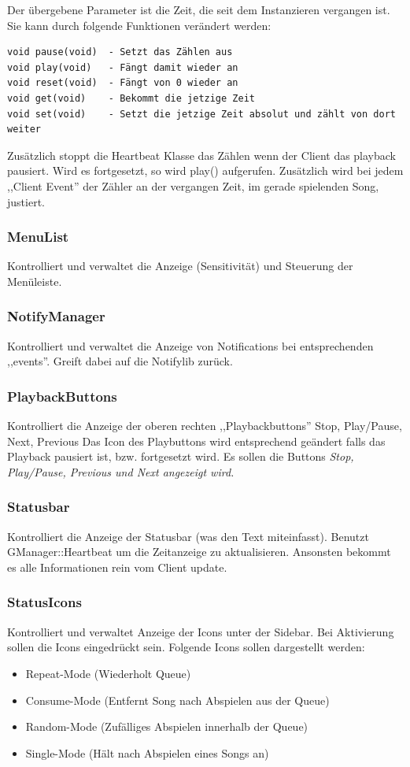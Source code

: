Der übergebene Parameter ist die Zeit, die seit dem Instanzieren vergangen ist. 
Sie kann durch folgende Funktionen verändert werden:
\begin{verbatim}
void pause(void)  - Setzt das Zählen aus
void play(void)   - Fängt damit wieder an
void reset(void)  - Fängt von 0 wieder an
void get(void)    - Bekommt die jetzige Zeit
void set(void)    - Setzt die jetzige Zeit absolut und zählt von dort weiter
\end{verbatim}

Zusätzlich stoppt die Heartbeat Klasse das Zählen wenn der Client das playback pausiert.
Wird es fortgesetzt, so wird play() aufgerufen. 
Zusätzlich wird bei jedem ,,Client Event'' der Zähler an der vergangen Zeit, im gerade spielenden Song, justiert.

\subsubsection{MenuList}
Kontrolliert und verwaltet die Anzeige (Sensitivität) und Steuerung der Menüleiste.

\subsubsection{NotifyManager}
Kontrolliert und verwaltet die Anzeige von Notifications bei entsprechenden ,,events''.
Greift dabei auf die Notifylib zurück.

\subsubsection{PlaybackButtons}
Kontrolliert die Anzeige der oberen rechten ,,Playbackbuttons'' Stop, Play/Pause, Next, Previous
Das Icon des Playbuttons wird entsprechend geändert falls das Playback pausiert ist,
bzw. fortgesetzt wird. Es sollen die Buttons \it Stop, Play/Pause, Previous und Next \rm angezeigt wird.

\subsubsection{Statusbar}
Kontrolliert die Anzeige der Statusbar (was den Text miteinfasst). 
Benutzt GManager::Heartbeat um die Zeitanzeige zu aktualisieren. Ansonsten bekommt es alle Informationen rein vom Client update.

\subsubsection{StatusIcons}
Kontrolliert und verwaltet Anzeige der Icons unter der Sidebar.
Bei Aktivierung sollen die Icons eingedrückt sein.
Folgende Icons sollen dargestellt werden:
\begin{itemize}
\item Repeat-Mode (Wiederholt Queue)
\item Consume-Mode (Entfernt Song nach Abspielen aus der Queue)
\item Random-Mode (Zufälliges Abspielen innerhalb der Queue)
\item Single-Mode (Hält nach Abspielen eines Songs an)
\end{itemize}


